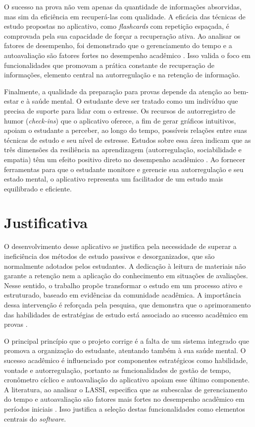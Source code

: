 O sucesso na prova não vem apenas da quantidade de informações absorvidas, mas sim da eficiência em recuperá-las com qualidade.
A eficácia das técnicas de estudo propostas no aplicativo, como \textit{flashcards} com repetição espaçada, é comprovada pela sua capacidade de forçar a recuperação ativa.
Ao analisar os fatores de desempenho, foi demonstrado que o gerenciamento do tempo e a autoavaliação são fatores fortes no desempenho acadêmico \cite{zhou_2016}.
Isso valida o foco em funcionalidades que promovam a prática constante de recuperação de informações, elemento central na autorregulação e na retenção de informação.

Finalmente, a qualidade da preparação para provas depende da atenção ao bem-estar e à saúde mental.
O estudante deve ser tratado como um indivíduo que precisa de suporte para lidar com o estresse.
Os recursos de autorregistro de humor (\textit{check-ins}) que o aplicativo oferece, a fim de gerar gráficos intuitivos, apoiam o estudante a perceber, ao longo do tempo, possíveis relações entre suas técnicas de estudo e seu nível de estresse.
Estudos sobre essa área indicam que as três dimensões da resiliência na aprendizagem (autorregulação, sociabilidade e empatia) têm um efeito positivo direto no desempenho acadêmico \cite{liu_2025}.
Ao fornecer ferramentas para que o estudante monitore e gerencie sua autorregulação e seu estado mental, o aplicativo representa um facilitador de um estudo mais equilibrado e eficiente.

\section{Justificativa}

O desenvolvimento desse aplicativo se justifica pela necessidade de superar a ineficiência dos métodos de estudo passivos e desorganizados, que são normalmente adotados pelos estudantes.
A dedicação à leitura de materiais não garante a retenção nem a aplicação do conhecimento em situações de avaliações.
Nesse sentido, o trabalho propõe transformar o estudo em um processo ativo e estruturado, baseado em evidências da comunidade acadêmica.
A importância dessa intervenção é reforçada pela pesquisa, que demonstra que o aprimoramento das habilidades de estratégias de estudo está associado ao sucesso acadêmico em provas \cite{khalil_2024}.

O principal princípio que o projeto corrige é a falta de um sistema integrado que promova a organização do estudante, atentando também à sua saúde mental.
O sucesso acadêmico é influenciado por componentes estratégicos como habilidade, vontade e autorregulação, portanto as funcionalidades de gestão de tempo, cronômetro cíclico e autoavaliação do aplicativo apoiam esse último componente.
A literatura, ao analisar o LASSI, especifica que as subescalas de gerenciamento do tempo e autoavaliação são fatores mais fortes no desempenho acadêmico em períodos iniciais \cite{zhou_2016}.
Isso justifica a seleção destas funcionalidades como elementos centrais do \textit{software}.

